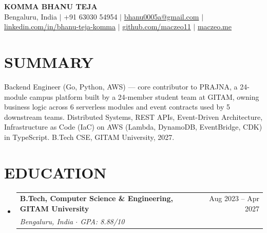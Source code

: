 \documentclass[letterpaper,10pt]{article}
\makeatletter
\newcommand{\resumeSubheading}[4]{
  \vspace{-1pt}\item
    \begin{tabular*}{\textwidth}[t]{@{}l@{\extracolsep{\fill}}r@{}}
      \textbf{#1} & {\color{dark-grey}\small #2}\\
      \textit{\color{dark-grey}\small #3} & {\color{dark-grey}\small #4}\\
    \end{tabular*}\vspace{-4pt}
}
\newcommand{\resumeSubHeadingListStart}{\begin{itemize}[leftmargin=0in, label={}, itemsep=2pt, parsep=0pt, topsep=3pt]}
\newcommand{\resumeSubHeadingListEnd}{\end{itemize}}
\makeatother
\begin{document}
\begin{center}
    {\color{navy}\textbf{\huge KOMMA BHANU TEJA}} \\ \vspace{4pt}
    \small
    Bengaluru, India \hspace{4pt}$|$\hspace{4pt}
    +91 63030 54954 \hspace{4pt}$|$\hspace{4pt}
    \href{mailto:bhanu0005a@gmail.com}{bhanu0005a@gmail.com} \hspace{4pt}$|$\hspace{4pt}
    \href{https://www.linkedin.com/in/bhanu-teja-komma-4b5547293/}{linkedin.com/in/bhanu-teja-komma} \hspace{4pt}$|$\hspace{4pt}
    \href{https://github.com/maczeo11}{github.com/maczeo11} \hspace{4pt}$|$\hspace{4pt}
    \href{https://maczeo.me}{maczeo.me}
\end{center}
\vspace{-6pt}

\section{SUMMARY}
{\small Backend Engineer (Go, Python, AWS) — core contributor to PRAJNA, a 24-module campus platform built by a 24-member student team at GIT{}AM, owning business logic across 6 serverless modules and event contracts used by 5 downstream teams. Distributed Systems, REST APIs, Event-Driven Architecture, Infrastructure as Code (IaC) on AWS (Lambda, DynamoDB, EventBridge, CDK) in T{}ypeScript. B.Tech CSE, GIT{}AM University, 2027.}

\section{EDUCATION}
  \resumeSubHeadingListStart
    \resumeSubheading
      {B.Tech, Computer Science \& Engineering, GIT{}AM University}{Aug 2023 -- Apr 2027}
      {Bengaluru, India $\cdot$ GPA: 8.88/10}{}
  \resumeSubHeadingListEnd

\end{document}
